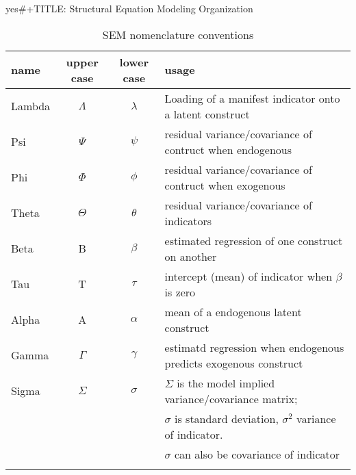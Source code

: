 \documentclass{article}
\author{William Murrah}
\date{\today}
\title{}
\begin{document}
\tableofcontents

yes\#+TITLE: Structural Equation Modeling Organization
\begin{table}[htb]
\caption{SEM nomenclature conventions}
\centering
\begin{tabular}{lccl}
\hline
name & upper case & lower case & usage\\
\hline
Lambda & \(\Lambda\) & \(\lambda\) & Loading of a manifest indicator onto a latent construct\\
Psi & \(\Psi\) & \(\psi\) & residual variance/covariance of contruct when endogenous\\
Phi & \(\Phi\) & \(\phi\) & residual variance/covariance of contruct when exogenous\\
Theta & \(\Theta\) & \(\theta\) & residual variance/covariance of indicators\\
Beta & B & \(\beta\) & estimated regression of one construct on another\\
Tau & T & \(\tau\) & intercept (mean) of indicator when \(\beta\) is zero\\
Alpha & A & \(\alpha\) & mean of a endogenous latent construct\\
Gamma & \(\Gamma\) & \(\gamma\) & estimatd regression when endogenous predicts exogenous construct\\
Sigma & \(\Sigma\) & \(\sigma\) & \(\Sigma\) is the model implied variance/covariance matrix;\\
 &  &  & \(\sigma\) is standard deviation, \(\sigma^{\text{2}}\) variance of indicator.\\
 &  &  & \(\sigma\) can also be covariance of indicator\\
\hline
 &  &  & \\
\end{tabular}
\end{table}
\end{document}
